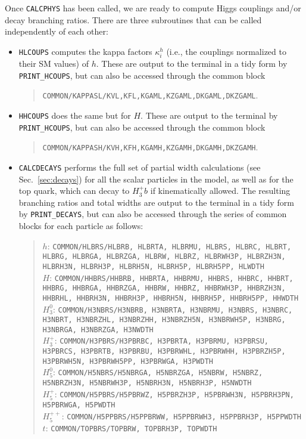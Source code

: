 \documentclass[11pt]{article}
\begin{document}
Once {\tt CALCPHYS} has been called, we are ready to compute Higgs couplings and/or decay branching ratios.  There are three subroutines that can be called independently of each other:
\begin{itemize}
\item {\tt HLCOUPS} computes the kappa factors $\kappa_i^h$ (i.e., the couplings normalized to their SM values) of $h$.  These are output to the terminal in a tidy form by {\tt PRINT\_HCOUPS}, but can also be accessed through the common block
\begin{quote}
	{\tt COMMON/KAPPASL/KVL,KFL,KGAML,KZGAML,DKGAML,DKZGAML}.
\end{quote}

\item {\tt HHCOUPS} does the same but for $H$.  These are output to the terminal by {\tt PRINT\_HCOUPS}, but can also be accessed through the common block 
\begin{quote}
	{\tt COMMON/KAPPASH/KVH,KFH,KGAMH,KZGAMH,DKGAMH,DKZGAMH}.
\end{quote}

\item {\tt CALCDECAYS} performs the full set of partial width calculations (see Sec.~\ref{sec:decays}) for all the scalar particles in the model, as well as for the top quark, which can decay to $H_3^+ b$ if kinematically allowed.  The resulting branching ratios and total widths are output to the terminal in a tidy form by {\tt PRINT\_DECAYS}, but can also be accessed through the series of common blocks for each particle as follows:
\begin{quote}
	$h$: {\tt COMMON/HLBRS/HLBRB, HLBRTA, HLBRMU, HLBRS, HLBRC, HLBRT,
      HLBRG, HLBRGA, HLBRZGA, HLBRW, HLBRZ, 
          HLBRWH3P, HLBRZH3N,
          HLBRH3N, HLBRH3P, HLBRH5N, HLBRH5P, HLBRH5PP, HLWDTH} \\
     $H$: {\tt COMMON/HHBRS/HHBRB, HHBRTA, HHBRMU, HHBRS, HHBRC, HHBRT,
          HHBRG, HHBRGA, HHBRZGA, HHBRW, HHBRZ, 
          HHBRWH3P, HHBRZH3N,
          HHBRHL, HHBRH3N, HHBRH3P, HHBRH5N, HHBRH5P, HHBRH5PP, 
          HHWDTH} \\
          $H_3^0$: {\tt COMMON/H3NBRS/H3NBRB, H3NBRTA, H3NBRMU, H3NBRS, H3NBRC, H3NBRT,
         H3NBRZHL, H3NBRZHH, H3NBRZH5N, H3NBRWH5P,
          H3NBRG, H3NBRGA, H3NBRZGA,
          H3NWDTH} \\
          $H_3^+$: {\tt COMMON/H3PBRS/H3PBRBC, H3PBRTA, H3PBRMU, H3PBRSU,
         H3PBRCS, H3PBRTB, H3PBRBU,
          H3PBRWHL, H3PBRWHH, H3PBRZH5P, H3PBRWH5N, H3PBRWH5PP, H3PBRWGA,
          H3PWDTH} \\
          $H_5^0$: {\tt COMMON/H5NBRS/H5NBRGA, H5NBRZGA, H5NBRW, H5NBRZ,
          H5NBRZH3N, H5NBRWH3P, 
          H5NBRH3N, H5NBRH3P,
          H5NWDTH} \\
	$H_5^+$: {\tt COMMON/H5PBRS/H5PBRWZ, H5PBRZH3P, H5PBRWH3N, H5PBRH3PN, H5PBRWGA, H5PWDTH} \\
	$H_5^{++}$: {\tt COMMON/H5PPBRS/H5PPBRWW, H5PPBRWH3, H5PPBRH3P, H5PPWDTH} \\
	$t$: {\tt COMMON/TOPBRS/TOPBRW, TOPBRH3P, TOPWDTH}
\end{quote}
\end{itemize}
\end{document}
